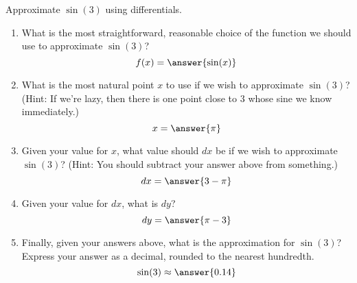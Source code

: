 \documentclass{ximera}
\author{Gregory Hartman \and Matthew Carr}
\begin{document}
\begin{exercise}




Approximate $\sin(3)$ using differentials.
\begin{enumerate}
\item		What is the most straightforward, reasonable choice of the function we should use to approximate $\sin(3)$?\[f(x)=\answer{\sin(x)}\]
\item		What is the most natural point $x$ to use if we wish to approximate $\sin(3)$? (Hint: If we're lazy, then there is one point close to $3$ whose sine we know immediately.) \[x=\answer{\pi}\]
\item		Given your value for $x$, what value should $dx$ be if we wish to approximate $\sin(3)$? (Hint: You should subtract your answer above from something.) \[dx=\answer{3-\pi}\]
\item		Given your value for $dx$, what is $dy$? \[dy=\answer{\pi-3}\]
\item		Finally, given your answers above, what is the approximation for $\sin(3)$? Express your answer as a decimal, rounded to the nearest hundredth. \[\sin(3)\approx\answer{0.14}\]
\end{enumerate}


\end{exercise}
\end{document}
